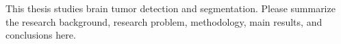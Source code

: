 \begin{abstract*}\xiaosi
  This thesis studies brain tumor detection and segmentation. Please summarize the research background, research problem, methodology, main results, and conclusions here.

\end{abstract*}
